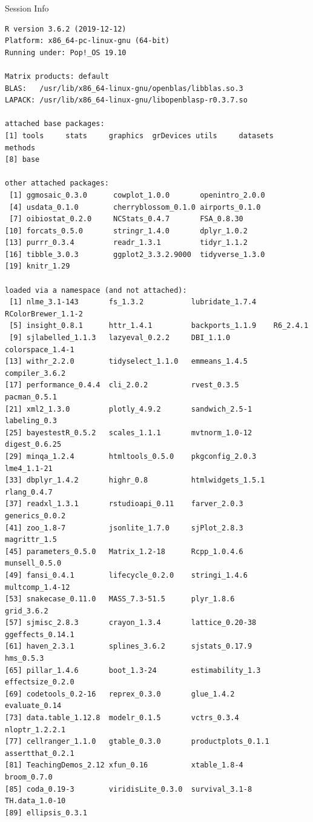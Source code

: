 \documentclass[10pt]{beamer}\usepackage[]{graphicx}\usepackage[]{color}
\makeatletter
\newenvironment{kframe}{%
 \def\at@end@of@kframe{}%
 \ifinner\ifhmode%
  \def\at@end@of@kframe{\end{minipage}}%
  \begin{minipage}{\columnwidth}%
 \fi\fi%
 \def\FrameCommand##1{\hskip\@totalleftmargin \hskip-\fboxsep
 \colorbox{shadecolor}{##1}\hskip-\fboxsep
     \hskip-\linewidth \hskip-\@totalleftmargin \hskip\columnwidth}%
 \MakeFramed {\advance\hsize-\width
   \@totalleftmargin\z@ \linewidth\hsize
   \@setminipage}}%
 {\par\unskip\endMakeFramed%
 \at@end@of@kframe}
\newenvironment{knitrout}{}{} %
\makeatother
\begin{document}
\begin{frame}[fragile]{Session Info}
	\tiny
	
\begin{knitrout}\tiny
{}\color{fgcolor}\begin{kframe}
\begin{verbatim}
R version 3.6.2 (2019-12-12)
Platform: x86_64-pc-linux-gnu (64-bit)
Running under: Pop!_OS 19.10

Matrix products: default
BLAS:   /usr/lib/x86_64-linux-gnu/openblas/libblas.so.3
LAPACK: /usr/lib/x86_64-linux-gnu/libopenblasp-r0.3.7.so

attached base packages:
[1] tools     stats     graphics  grDevices utils     datasets  methods  
[8] base     

other attached packages:
 [1] ggmosaic_0.3.0      cowplot_1.0.0       openintro_2.0.0    
 [4] usdata_0.1.0        cherryblossom_0.1.0 airports_0.1.0     
 [7] oibiostat_0.2.0     NCStats_0.4.7       FSA_0.8.30         
[10] forcats_0.5.0       stringr_1.4.0       dplyr_1.0.2        
[13] purrr_0.3.4         readr_1.3.1         tidyr_1.1.2        
[16] tibble_3.0.3        ggplot2_3.3.2.9000  tidyverse_1.3.0    
[19] knitr_1.29         

loaded via a namespace (and not attached):
 [1] nlme_3.1-143       fs_1.3.2           lubridate_1.7.4    RColorBrewer_1.1-2
 [5] insight_0.8.1      httr_1.4.1         backports_1.1.9    R6_2.4.1          
 [9] sjlabelled_1.1.3   lazyeval_0.2.2     DBI_1.1.0          colorspace_1.4-1  
[13] withr_2.2.0        tidyselect_1.1.0   emmeans_1.4.5      compiler_3.6.2    
[17] performance_0.4.4  cli_2.0.2          rvest_0.3.5        pacman_0.5.1      
[21] xml2_1.3.0         plotly_4.9.2       sandwich_2.5-1     labeling_0.3      
[25] bayestestR_0.5.2   scales_1.1.1       mvtnorm_1.0-12     digest_0.6.25     
[29] minqa_1.2.4        htmltools_0.5.0    pkgconfig_2.0.3    lme4_1.1-21       
[33] dbplyr_1.4.2       highr_0.8          htmlwidgets_1.5.1  rlang_0.4.7       
[37] readxl_1.3.1       rstudioapi_0.11    farver_2.0.3       generics_0.0.2    
[41] zoo_1.8-7          jsonlite_1.7.0     sjPlot_2.8.3       magrittr_1.5      
[45] parameters_0.5.0   Matrix_1.2-18      Rcpp_1.0.4.6       munsell_0.5.0     
[49] fansi_0.4.1        lifecycle_0.2.0    stringi_1.4.6      multcomp_1.4-12   
[53] snakecase_0.11.0   MASS_7.3-51.5      plyr_1.8.6         grid_3.6.2        
[57] sjmisc_2.8.3       crayon_1.3.4       lattice_0.20-38    ggeffects_0.14.1  
[61] haven_2.3.1        splines_3.6.2      sjstats_0.17.9     hms_0.5.3         
[65] pillar_1.4.6       boot_1.3-24        estimability_1.3   effectsize_0.2.0  
[69] codetools_0.2-16   reprex_0.3.0       glue_1.4.2         evaluate_0.14     
[73] data.table_1.12.8  modelr_0.1.5       vctrs_0.3.4        nloptr_1.2.2.1    
[77] cellranger_1.1.0   gtable_0.3.0       productplots_0.1.1 assertthat_0.2.1  
[81] TeachingDemos_2.12 xfun_0.16          xtable_1.8-4       broom_0.7.0       
[85] coda_0.19-3        viridisLite_0.3.0  survival_3.1-8     TH.data_1.0-10    
[89] ellipsis_0.3.1    
\end{verbatim}
\end{kframe}
\end{knitrout}
	
\end{frame}
\end{document}
